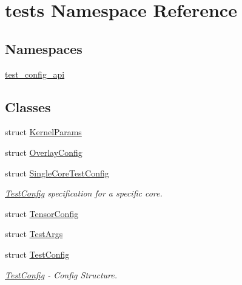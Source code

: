 \hypertarget{namespacetests}{}\section{tests Namespace Reference}
\label{namespacetests}
\subsection*{Namespaces}
\begin{DoxyCompactItemize}
\item 
 \hyperlink{namespacetests_1_1test__config__api}{test\+\_\+config\+\_\+api}
\end{DoxyCompactItemize}
\subsection*{Classes}
\begin{DoxyCompactItemize}
\item 
struct \hyperlink{structtests_1_1KernelParams}{Kernel\+Params}
\item 
struct \hyperlink{structtests_1_1OverlayConfig}{Overlay\+Config}
\item 
struct \hyperlink{structtests_1_1SingleCoreTestConfig}{Single\+Core\+Test\+Config}
\begin{DoxyCompactList}\small\item\em \hyperlink{structtests_1_1TestConfig}{Test\+Config} specification for a specific core. \end{DoxyCompactList}\item 
struct \hyperlink{structtests_1_1TensorConfig}{Tensor\+Config}
\item 
struct \hyperlink{structtests_1_1TestArgs}{Test\+Args}
\item 
struct \hyperlink{structtests_1_1TestConfig}{Test\+Config}
\begin{DoxyCompactList}\small\item\em \hyperlink{structtests_1_1TestConfig}{Test\+Config} -\/ Config Structure. \end{DoxyCompactList}\end{DoxyCompactItemize}
